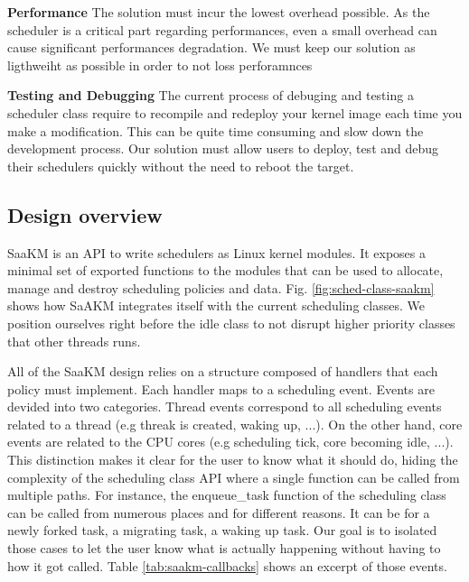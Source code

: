 \textbf{Performance} The solution must incur the lowest overhead possible. As the scheduler is a critical part regarding performances, even a small overhead can cause significant performances degradation. We must keep our solution as ligthweiht as possible in order to not loss perforamnces\newline

\textbf{Testing and Debugging} The current process of debuging and testing a scheduler class require to recompile and redeploy your kernel image each time you make a modification. This can be quite time consuming and slow down the development process. Our solution must allow users to deploy, test and debug their schedulers quickly without the need to reboot the target.\newline
\subsection{Design overview}
\par SaaKM is an API to write schedulers as Linux kernel modules. It exposes a minimal set of exported functions to the modules that can be used to allocate, manage and destroy scheduling policies and data. Fig. \ref{fig:sched-class-saakm} shows how SaAKM integrates itself with the current scheduling classes. We position ourselves right before the idle class to not disrupt higher priority classes that other threads runs.\newline

\par All of the SaaKM design relies on a structure composed of handlers that each policy must implement. Each handler maps to a scheduling event. Events are devided into two categories. Thread events correspond to all scheduling events related to a thread (e.g threak is created, waking up, ...). On the other hand, core events are related to the CPU cores (e.g scheduling tick, core becoming idle, ...). This distinction makes it clear for the user to know what it should do, hiding the complexity of the scheduling class API where a single function can be called from multiple paths. For instance, the enqueue\_task function of the scheduling class can be called from numerous places and for different reasons. It can be for a newly forked task, a migrating task, a waking up task. Our goal is to isolated those cases to let the user know what is actually happening without having to how it got called. Table \ref{tab:saakm-callbacks} shows an excerpt of those events.\newline

